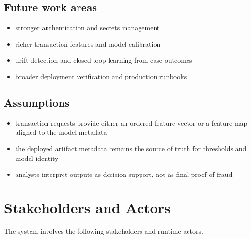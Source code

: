 \documentclass[11pt]{article}
\begin{document}
\subsection*{Future work areas}
\begin{itemize}
  \item stronger authentication and secrets management
  \item richer transaction features and model calibration
  \item drift detection and closed-loop learning from case outcomes
  \item broader deployment verification and production runbooks
\end{itemize}

\subsection*{Assumptions}
\begin{itemize}
  \item transaction requests provide either an ordered feature vector or a feature map aligned to the model metadata
  \item the deployed artifact metadata remains the source of truth for thresholds and model identity
  \item analysts interpret outputs as decision support, not as final proof of fraud
\end{itemize}

\section{Stakeholders and Actors}
The system involves the following stakeholders and runtime actors.
\end{document}
